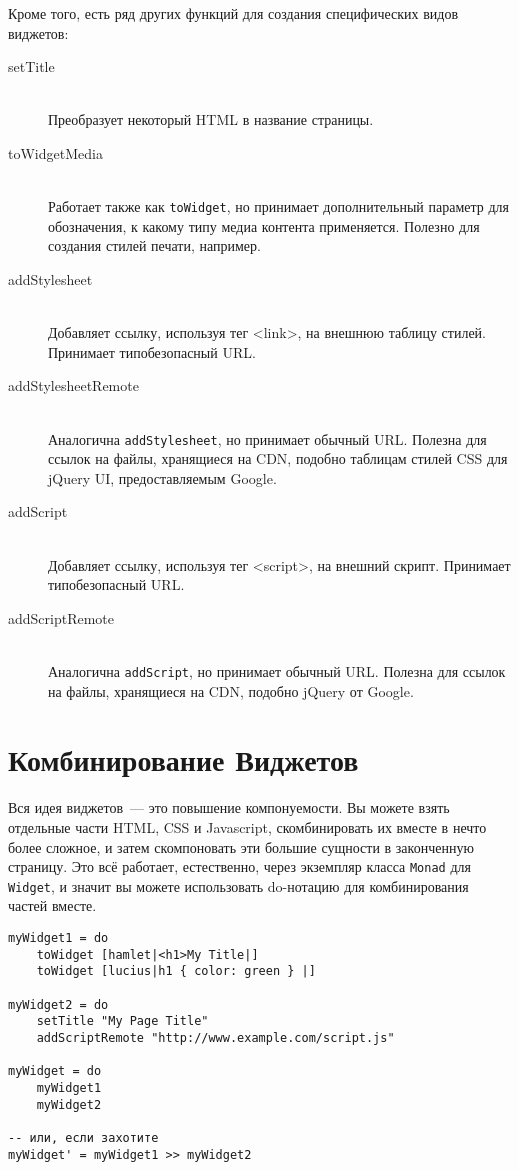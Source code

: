 Кроме того, есть ряд других функций для создания специфических видов виджетов:
\begin{description}
    \item[setTitle] \hfill \\
        Преобразует некоторый HTML в название страницы.

    \item[toWidgetMedia] \hfill \\
        Работает также как \lstinline'toWidget', но принимает дополнительный
        параметр для обозначения, к какому типу медиа контента применяется.
        Полезно для создания стилей печати, например.

    \item[addStylesheet] \hfill \\
        Добавляет ссылку, используя тег <link>, на внешнюю таблицу стилей.
        Принимает типобезопасный URL.

    \item[addStylesheetRemote] \hfill \\
        Аналогична \lstinline'addStylesheet', но принимает обычный URL. Полезна
        для ссылок на файлы, хранящиеся на CDN, подобно таблицам стилей CSS для
        jQuery UI, предоставляемым Google.

    \item[addScript] \hfill \\
        Добавляет ссылку, используя тег <script>, на внешний скрипт. Принимает
        типобезопасный URL.

    \item[addScriptRemote] \hfill \\
        Аналогична \lstinline'addScript', но принимает обычный URL. Полезна для
        ссылок на файлы, хранящиеся на CDN, подобно jQuery от Google.
\end{description}

\section{Комбинирование Виджетов}
Вся идея виджетов~--- это повышение компонуемости. Вы можете взять отдельные
части HTML, CSS и Javascript, скомбинировать их вместе в нечто более сложное, и
затем скомпоновать эти большие сущности в законченную страницу. Это всё
работает, естественно, через экземпляр класса \lstinline'Monad' для
\lstinline'Widget', и значит вы можете использовать do-нотацию для
комбинирования частей вместе.
\begin{lstlisting}
myWidget1 = do
    toWidget [hamlet|<h1>My Title|]
    toWidget [lucius|h1 { color: green } |]

myWidget2 = do
    setTitle "My Page Title"
    addScriptRemote "http://www.example.com/script.js"

myWidget = do
    myWidget1
    myWidget2

-- или, если захотите
myWidget' = myWidget1 >> myWidget2
\end{lstlisting}

